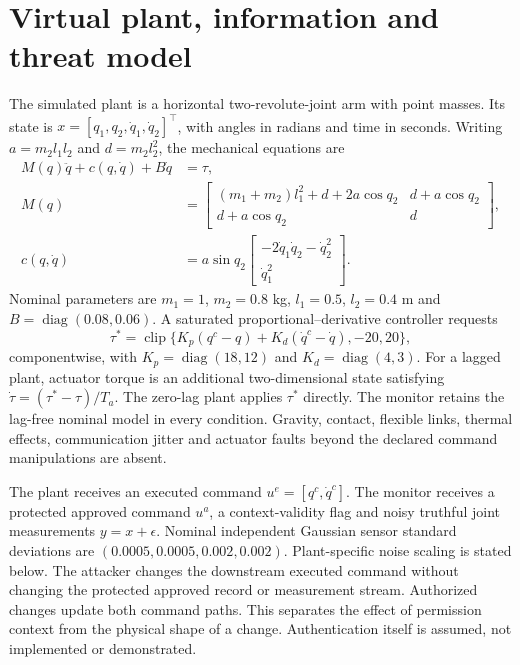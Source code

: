\section{Virtual plant, information and threat model}
The simulated plant is a horizontal two-revolute-joint arm with point masses. Its state is $x=[q_1,q_2,\dot q_1,\dot q_2]^\top$, with angles in radians and time in seconds. Writing $a=m_2l_1l_2$ and $d=m_2l_2^2$, the mechanical equations are
\begin{align}
 M(q)\ddot q+c(q,\dot q)+B\dot q&=\tau,\\
 M(q)&=\begin{bmatrix}
 (m_1+m_2)l_1^2+d+2a\cos q_2 & d+a\cos q_2\\
 d+a\cos q_2 & d
 \end{bmatrix},\\
 c(q,\dot q)&=a\sin q_2\begin{bmatrix}-2\dot q_1\dot q_2-\dot q_2^2\\\dot q_1^2\end{bmatrix}.
\end{align}
Nominal parameters are $m_1=1$, $m_2=0.8$ kg, $l_1=0.5$, $l_2=0.4$ m and $B=\operatorname{diag}(0.08,0.06)$. A saturated proportional--derivative controller requests
\begin{equation}
 \tau^*=\operatorname{clip}\{K_p(q^c-q)+K_d(\dot q^c-\dot q),-20,20\},
\end{equation}
componentwise, with $K_p=\operatorname{diag}(18,12)$ and $K_d=\operatorname{diag}(4,3)$. For a lagged plant, actuator torque is an additional two-dimensional state satisfying $\dot\tau=(\tau^*-\tau)/T_a$. The zero-lag plant applies $\tau^*$ directly. The monitor retains the lag-free nominal model in every condition. Gravity, contact, flexible links, thermal effects, communication jitter and actuator faults beyond the declared command manipulations are absent.

The plant receives an executed command $u^e=[q^c,\dot q^c]$. The monitor receives a protected approved command $u^a$, a context-validity flag and noisy truthful joint measurements $y=x+\epsilon$. Nominal independent Gaussian sensor standard deviations are $(0.0005,0.0005,0.002,0.002)$. Plant-specific noise scaling is stated below. The attacker changes the downstream executed command without changing the protected approved record or measurement stream. Authorized changes update both command paths. This separates the effect of permission context from the physical shape of a change. Authentication itself is assumed, not implemented or demonstrated.

